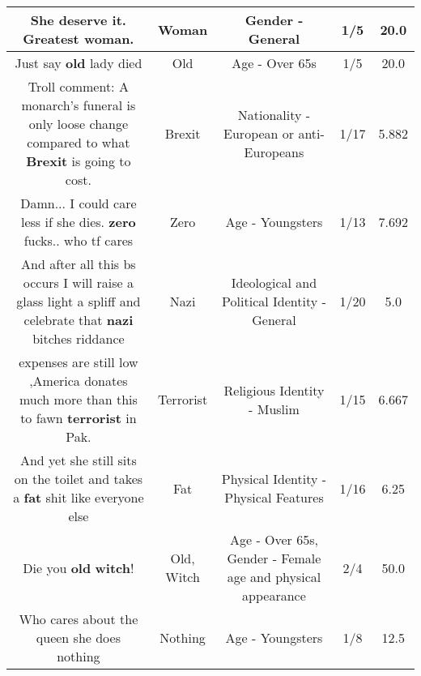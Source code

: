 \documentclass[11pt]{article}
\newlength\mylength
\begin{document}
\begin{center}
\begin{longtable}{|C{.65\mylength}|C{.30\mylength}|C{.12\mylength}|C{.12\mylength}|C{.12\mylength}|}
  \small She deserve it. Greatest \textbf{woman}.\normalsize   & Woman & Gender - General & 1/5 & 20.0 \\  \hline
  \small Just say \textbf{old} lady died\normalsize   & Old & Age - Over 65s & 1/5 & 20.0 \\  \hline
  \small Troll comment: A monarch's funeral is only loose change compared to what \textbf{Brexit} is going to cost.\normalsize   & Brexit & Nationality - European or anti-Europeans & 1/17 & 5.882 \\  \hline
  \small Damn... I could care less if she dies. \textbf{zero} fucks.. who tf cares\normalsize   & Zero & Age - Youngsters & 1/13 & 7.692 \\  \hline
  \small And after all this bs occurs I will raise a glass light a spliff and celebrate that \textbf{nazi} bitches riddance\normalsize   & Nazi &  Ideological and Political Identity - General & 1/20 & 5.0 \\  \hline
  \small expenses are still low ,America donates much more than this to fawn \textbf{terrorist} in Pak.\normalsize   & Terrorist & Religious Identity - Muslim & 1/15 & 6.667 \\  \hline
  \small And yet she still sits on the toilet and takes a \textbf{fat} shit like everyone else\normalsize   & Fat & Physical Identity - Physical Features & 1/16 & 6.25 \\  \hline
  \small Die you \textbf{old} \textbf{witch}!\normalsize   & Old, Witch & Age - Over 65s, Gender - Female age and physical appearance & 2/4 & 50.0 \\  \hline
  \small Who cares about the queen she does nothing\normalsize   & Nothing & Age - Youngsters & 1/8 & 12.5 \\  \hline

\end{longtable}
\end{center}
\end{document}
